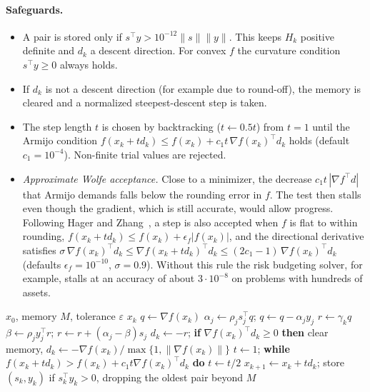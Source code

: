 \documentclass[11pt,a4paper]{article}
\newcommand{\norm}[1]{\lVert #1\rVert}
\begin{document}
\paragraph{Safeguards.}
\begin{itemize}
  \item A pair is stored only if $s^\top y > 10^{-12}\norm{s}\norm{y}$.
        This keeps $H_k$ positive definite and $d_k$ a descent direction.
        For convex $f$ the curvature condition $s^\top y\ge 0$ always holds.
  \item If $d_k$ is not a descent direction (for example due to round-off), the memory is
        cleared and a normalized steepest-descent step is taken.
  \item The step length $t$ is chosen by backtracking ($t\gets 0.5t$) from $t=1$
        until the Armijo condition
        $f(x_k+t d_k)\le f(x_k)+c_1 t\,\nabla f(x_k)^\top d_k$ holds
        (default $c_1=10^{-4}$). Non-finite trial values are rejected.
  \item \emph{Approximate Wolfe acceptance.} Close to a minimizer, the decrease
        $c_1 t\,|\nabla f^\top d|$ that Armijo demands falls below the rounding
        error in $f$. The test then stalls even though the gradient, which
        is still accurate, would allow progress. Following Hager and
        Zhang~\cite{hager2005}, a step is also accepted when $f$ is flat to
        within rounding, $f(x_k+td_k)\le f(x_k)+\epsilon_f|f(x_k)|$, and the
        directional derivative satisfies
        $\sigma\,\nabla f(x_k)^\top d_k \le \nabla f(x_k+td_k)^\top d_k \le (2c_1-1)\,\nabla f(x_k)^\top d_k$
        (defaults $\epsilon_f=10^{-10}$, $\sigma=0.9$). Without this rule the risk
        budgeting solver, for example, stalls at an accuracy of about $3\cdot 10^{-8}$ on
        problems with hundreds of assets.
\end{itemize}

\begin{algorithm}[ht]
\caption{L-BFGS with Armijo backtracking}\label{alg:lbfgs}
\begin{algorithmic}[1]
\Require $x_0$, memory $M$, tolerance $\varepsilon$
  \If{$\norm{\nabla f(x_k)}_\infty\le\varepsilon$} \Return $x_k$ \EndIf
  \State $q\gets\nabla f(x_k)$
   
    \State $\alpha_j\gets\rho_j s_j^\top q$; \quad $q\gets q-\alpha_j y_j$
  \EndFor
  \State $r\gets\gamma_k q$
   
    \State $\beta\gets\rho_j y_j^\top r$; \quad $r\gets r+(\alpha_j-\beta)s_j$
  \EndFor
  \State $d_k\gets -r$; \textbf{if} $\nabla f(x_k)^\top d_k\ge 0$ \textbf{then} clear memory, $d_k\gets-\nabla f(x_k)/\max\{1,\norm{\nabla f(x_k)}\}$
  \State $t\gets 1$; \textbf{while} $f(x_k+td_k)>f(x_k)+c_1t\nabla f(x_k)^\top d_k$ \textbf{do} $t\gets t/2$
  \State $x_{k+1}\gets x_k+td_k$; store $(s_k,y_k)$ if $s_k^\top y_k>0$, dropping the oldest pair beyond $M$
\EndFor
\end{algorithmic}
\end{algorithm}
\end{document}
